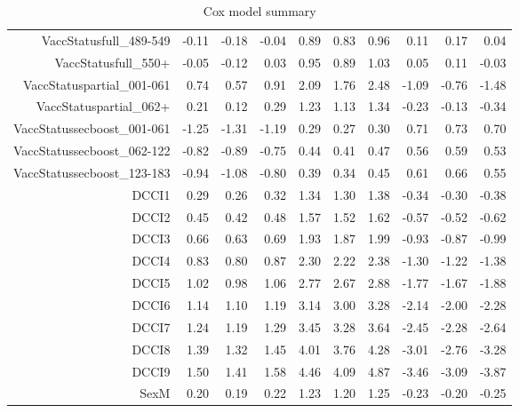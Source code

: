 \begin{table}[ht]
\begin{tabular}{rrrrrrrrrr}
  VaccStatusfull\_489-549 & -0.11 & -0.18 & -0.04 & 0.89 & 0.83 & 0.96 & 0.11 & 0.17 & 0.04 \\ 
  VaccStatusfull\_550+ & -0.05 & -0.12 & 0.03 & 0.95 & 0.89 & 1.03 & 0.05 & 0.11 & -0.03 \\ 
  VaccStatuspartial\_001-061 & 0.74 & 0.57 & 0.91 & 2.09 & 1.76 & 2.48 & -1.09 & -0.76 & -1.48 \\ 
  VaccStatuspartial\_062+ & 0.21 & 0.12 & 0.29 & 1.23 & 1.13 & 1.34 & -0.23 & -0.13 & -0.34 \\ 
  VaccStatussecboost\_001-061 & -1.25 & -1.31 & -1.19 & 0.29 & 0.27 & 0.30 & 0.71 & 0.73 & 0.70 \\ 
  VaccStatussecboost\_062-122 & -0.82 & -0.89 & -0.75 & 0.44 & 0.41 & 0.47 & 0.56 & 0.59 & 0.53 \\ 
  VaccStatussecboost\_123-183 & -0.94 & -1.08 & -0.80 & 0.39 & 0.34 & 0.45 & 0.61 & 0.66 & 0.55 \\ 
  DCCI1 & 0.29 & 0.26 & 0.32 & 1.34 & 1.30 & 1.38 & -0.34 & -0.30 & -0.38 \\ 
  DCCI2 & 0.45 & 0.42 & 0.48 & 1.57 & 1.52 & 1.62 & -0.57 & -0.52 & -0.62 \\ 
  DCCI3 & 0.66 & 0.63 & 0.69 & 1.93 & 1.87 & 1.99 & -0.93 & -0.87 & -0.99 \\ 
  DCCI4 & 0.83 & 0.80 & 0.87 & 2.30 & 2.22 & 2.38 & -1.30 & -1.22 & -1.38 \\ 
  DCCI5 & 1.02 & 0.98 & 1.06 & 2.77 & 2.67 & 2.88 & -1.77 & -1.67 & -1.88 \\ 
  DCCI6 & 1.14 & 1.10 & 1.19 & 3.14 & 3.00 & 3.28 & -2.14 & -2.00 & -2.28 \\ 
  DCCI7 & 1.24 & 1.19 & 1.29 & 3.45 & 3.28 & 3.64 & -2.45 & -2.28 & -2.64 \\ 
  DCCI8 & 1.39 & 1.32 & 1.45 & 4.01 & 3.76 & 4.28 & -3.01 & -2.76 & -3.28 \\ 
  DCCI9 & 1.50 & 1.41 & 1.58 & 4.46 & 4.09 & 4.87 & -3.46 & -3.09 & -3.87 \\ 
  SexM & 0.20 & 0.19 & 0.22 & 1.23 & 1.20 & 1.25 & -0.23 & -0.20 & -0.25 \\ 
   \hline
\end{tabular}
\caption{Cox model summary} 
\end{table}
